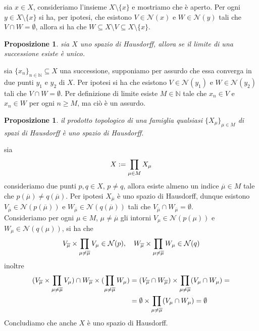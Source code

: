 \documentclass[oneside, 11pt]{amsbook}
\makeatletter
\newcommand{\0}{{(0)}}
\newcommand{\3}{{(3)}}
\theoremstyle{colonplain}
\newtheorem{prop}[thm]{Proposizione}
\theoremstyle{colondefinition}
\theoremstyle{colonremark}
\numberwithin{equation}{chapter}
\renewcommand{\proofname}{Dimostrazione}
\renewenvironment{proof}[1][\proofname]{\par
  \pushQED{\qed}%
  \normalfont \topsep6\p@\@plus6\p@\relax
  \trivlist
  \item[\hskip\labelsep\bfseries #1:]\ignorespaces
}{%
  \popQED\endtrivlist\@endpefalse
}
\makeatother
\begin{document}
\begin{proof} sia $x \in X$, consideriamo l'insieme $X \setminus \{ x \}$ e mostriamo che è aperto. Per ogni $y \in X \setminus \{ x \}$ si ha, per ipotesi, che esistono $V \in \mathcal{N}(x)$ e $W \in \mathcal{N}(y)$ tali che $V \cap W = \emptyset$, allora si ha che $W \subseteq X \setminus V \subseteq X \setminus \{ x \}$.
\end{proof}
\begin{prop}
sia $X$ uno spazio di Hausdorff, allora se il limite di una successione esiste è unico.
\end{prop}
\begin{proof}
sia $\{ x_n \}_{n \in \mathbb{N}} \subseteq X$ una successione, supponiamo per assurdo che essa converga in due punti $y_1$ e $y_2$ di $X$. Per ipotesi si ha che esistono $V \in \mathcal{N}(y_1)$ e $W \in \mathcal{N}(y_2)$ tali che $V \cap W = \emptyset$. Per definizione di limite esiste $M \in \mathbb{N}$ tale che $x_n \in V$ e $x_n \in W$ per ogni $n \geq M$, ma ciò è un assurdo.
\end{proof}
\begin{prop}
il prodotto topologico di una famiglia qualsiasi $\{ X_\mu \}_{\mu \in M}$ di spazi di Hausdorff è uno spazio di Hausdorff.
\end{prop}
\begin{proof}
sia
\begin{align}
    X := \prod_{\mu \in M} X_\mu \notag
\end{align}
consideriamo due punti $p, q \in X$, $p \neq q$, allora esiste almeno un indice $\overline{\mu} \in M$ tale che $p(\overline{\mu}) \neq q(\overline{\mu})$. Per ipotesi $X_{\overline{\mu}}$ è uno spazio di Hausdorff, dunque esistono $V_{\overline{\mu}} \in \mathcal{N}(p(\overline{\mu}))$ e $W_{\overline{\mu}} \in \mathcal{N}(q(\overline{\mu}))$ tali che $V_{\overline{\mu}} \cap W_{\overline{\mu}} = \emptyset$. \\
Consideriamo per ogni $\mu \in M$, $\mu \neq \overline{\mu}$ gli intorni $V_\mu \in \mathcal{N}(p(\mu))$ e $W_\mu \in \mathcal{N}(q(\mu))$, si ha che
\begin{align}
    V_{\overline{\mu}} \times \prod_{\mu \neq \overline{\mu}} V_\mu \in \mathcal{N}(p), \quad W_{\overline{\mu}} \times \prod_{\mu \neq \overline{\mu}} W_\mu \in \mathcal{N}(q) \notag
\end{align}
inoltre
\begin{align}
    (V_{\overline{\mu}} \times \prod_{\mu \neq \overline{\mu}} V_\mu) \cap W_{\overline{\mu}} \times (\prod_{\mu \neq \overline{\mu}} W_\mu) &= (V_{\overline{\mu}} \cap W_{\overline{\mu}}) \times \prod_{\mu \neq \overline{\mu}} (V_\mu \cap W_\mu) = \notag \\
    &= \emptyset \times \prod_{\mu \neq \overline{\mu}} (V_\mu \cap W_\mu) = \emptyset \notag
\end{align}
Concludiamo che anche $X$ è uno spazio di Hausdorff.
\end{proof}
\end{document}
